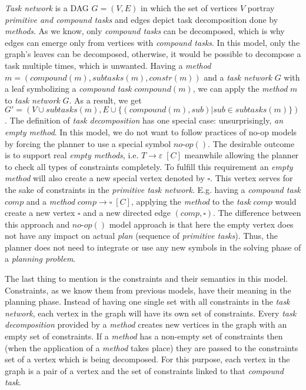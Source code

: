 \medskip\noindent
\emph{Task network} is a DAG $G = (V, E)$ in which the set of vertices $V$ portray \emph{primitive and compound tasks} and edges depict task decomposition done by \emph{methods}. As we know, only \emph{compound tasks} can be decomposed, which is why edges can emerge only from vertices with \emph{compound tasks}. In this model, only the graph's leaves can be decomposed, otherwise, it would be possible to decompose a task multiple times, which is unwanted. Having a \emph{method} $m = (compound(m), subtasks(m), constr(m))$ and a \emph{task network} $G$ with a leaf symbolizing a \emph{compound task} $compound(m)$, we can apply the \emph{method} $m$ to \emph{task network} $G$. As a result, we get $G' = (V \cup subtasks(m), E \cup \{(compound(m), sub) | sub \in subtasks(m)\})$. The definition of \emph{task decomposition} has one special case: unsurprisingly, \emph{an empty method}. In this model, we do not want to follow practices of no-op models by forcing the planner to use a special symbol $no\text{-}op()$. The desirable outcome is to support real \emph{empty methods}, i.e. $T \rightarrow \varepsilon \; [C]$ meanwhile allowing the planner to check all types of constraints completely. To fulfill this requirement an \emph{empty method} will also create a new special vertex denoted by $\square$. This vertex serves for the sake of constraints in the \emph{primitive task network}. E.g. having a \emph{compound task} $comp$ and a \emph{method} $comp \rightarrow \square \; [C]$, applying the \emph{method} to the \emph{task} $comp$ would create a new vertex $\square$ and a new directed edge $(comp, \square)$. The difference between this approach and $no\text{-}op()$ model approach is that here the empty vertex does not have any impact on actual \emph{plan} (sequence of \emph{primitive tasks}). Thus, the planner does not need to integrate or use any new symbols in the solving phase of a \emph{planning problem}. 

\medskip\noindent
The last thing to mention is the constraints and their semantics in this model. Constraints, as we know them from previous models, have their meaning in the planning phase. Instead of having one single set with all constraints in the \emph{task network}, each vertex in the graph will have its own set of constraints. Every \emph{task decomposition} provided by a \emph{method} creates new vertices in the graph with an empty set of constraints. If a \emph{method} has a non-empty set of constraints then (when the application of a \emph{method} takes place) they are passed to the constraints set of a vertex which is being decomposed. For this purpose, each vertex in the graph is a pair of a vertex and the set of constraints linked to that \emph{compound task}.

